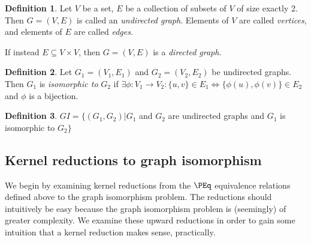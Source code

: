 \documentclass{amsart}
\theoremstyle{definition} \newtheorem{definition}[definition]{Definition}
\newcommand{\defn}[1]{\emph{#1}} %
\begin{document}
\begin{definition}
  Let $V$ be a set, $E$ be a collection of subsets of $V$ of size exactly
  2. Then $G=(V, E)$ is called an \defn{undirected graph}. Elements of $V$ are
  called \defn{vertices}, and elements of $E$ are called \defn{edges}.

  If instead $E\subseteq V\times V$, then $G=(V, E)$ is a \defn{directed
    graph}.
\end{definition}
\begin{definition}
  Let $G_1=(V_1,E_1)$ and $G_2=(V_2, E_2)$ be undirected graphs. Then $G_1$ is
  \defn{isomorphic to} $G_2$ if $\exists \phi\colon V_1\to V_2:\{u,v\}\in
  E_1\iff \{\phi(u), \phi(v)\}\in E_2$ and $\phi$ is a bijection.
\end{definition}
\begin{definition}
  $GI=\{(G_1, G_2)|G_1$ and $G_2$ are undirected graphs and $G_1$ is isomorphic
  to $G_2\}$
\end{definition}

\subsection{Kernel reductions to graph isomorphism}
We begin by examining kernel reductions from the $\PEq$ equivalence relations
defined above to the graph isomorphism problem. The reductions should
intuitively be easy because the graph isomorphism problem is (seemingly) of
greater complexity. We examine these upward reductions in order to gain some
intuition that a kernel reduction makes sense, practically.
\end{document}
